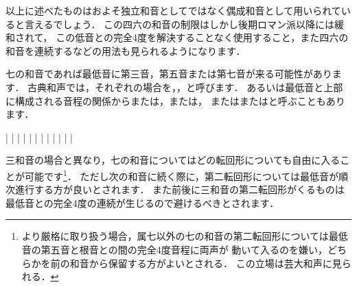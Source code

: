 \documentclass[dvipdfmx,uplatex,b5paper,openany,jbase=12Q,nomag*,textwidth-limit=44%
               ]{gachimuchi}[2020/05/05]
\begin{document}
\begin{Yodan}
以上に述べたものはおよそ独立和音としてではなく偶成和音として用いられていると言えるでしょう．
この四六の和音の制限はしかし後期ロマン派以降には緩和されて，
この低音との完全4度を解決することなく使用すること，また四六の和音を連続するなどの用法も見られるようになります．


\end{Yodan}

七の和音であれば最低音に第三音，第五音または第七音が来る可能性があります．
古典和声では，それぞれの場合を，，と呼びます．
あるいは最低音と上部に構成される音程の関係からまたは，または，
またはまたはと呼ぶこともあります．

\begin{Music}[0.6\linewidth]
  \Startpiece
  \znotes|\en%
  \NOTEs%
  |%
  \en%
  \NOTes|\sk\en%
  \NOTes|\sk\en%
  \xbar%
  \znotes|\en%
  \NOTEs%
  |%
  \en%
  \NOTes|\sk\en%
  \NOTes|\sk\en%
  \xbar%
  \znotes|\en%
  \NOTEs%
  |%
  \en%
  \NOTes|\sk\en%
  \NOTes|\sk\en%
  \endpiece
\end{Music}
\begin{Yodan}
三和音の場合と異なり，七の和音についてはどの転回形についても自由に入ることが可能です\footnote{%
  より厳格に取り扱う場合，属七以外の七の和音の第二転回形については最低音の第五音と根音との間の完全4度音程に両声が
  動いて入るのを嫌い，どちらかを前の和音から保留する方がよいとされる．
  この立場は芸大和声\cite{chSHIMAOKA1i,chSHIMAOKA1ii,chSHIMAOKA1iii}に見られる．
}．
ただし次の和音に続く際に，第二転回形については最低音が順次進行する方が良いとされます．
また前後に三和音の第二転回形がくるものは最低音との完全4度の連続が生じるので避けるべきとされます．
\end{Yodan}
\end{document}
